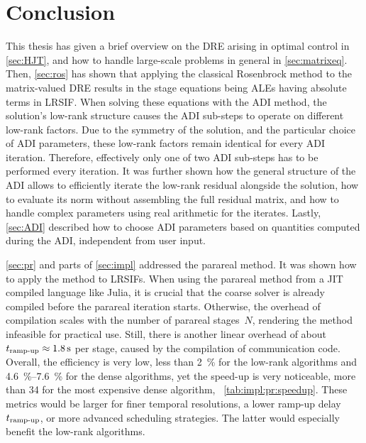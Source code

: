\chapter{Conclusion}
\label{sec:conclusion}


This thesis has given a brief overview on the \ac{DRE} arising in optimal control in \autoref{sec:HJT},
and how to handle large-scale problems in general in \autoref{sec:matrixeq}.
Then, \autoref{sec:ros} has shown that
applying the classical Rosenbrock method to the matrix-valued \ac{DRE}
results in the stage equations being \acp{ALE}
having absolute terms in \ac{LRSIF}.
When solving these equations with the \ac{ADI} method,
the solution's low-rank structure causes the \ac{ADI} sub-steps to operate on different low-rank factors.
Due to the symmetry of the solution,
and the particular choice of \ac{ADI} parameters,
these low-rank factors remain identical for every \ac{ADI} iteration.
Therefore, effectively only one of two \ac{ADI} sub-steps has to be performed every iteration.
It was further shown how the general structure of the \ac{ADI} allows to efficiently iterate the low-rank residual alongside the solution,
how to evaluate its norm without assembling the full residual matrix,
and how to handle complex parameters using real arithmetic for the iterates.
Lastly, \autoref{sec:ADI} described how to choose \ac{ADI} parameters based on quantities computed during the \ac{ADI},
\ie independent from user input.

\autoref{sec:pr} and parts of \autoref{sec:impl} addressed the parareal method.
It was shown how to apply the method to \acp{LRSIF}.
When using the parareal method from a \ac{JIT} compiled language like Julia,
it is crucial that the coarse solver is already compiled before the parareal iteration starts.
Otherwise, the overhead of compilation scales with the number of parareal stages~$N$,
rendering the method infeasible for practical use.
Still, there is another linear overhead of about $t_\text{ramp-up} \approx \SI{1.8}{\second}$ per stage,
caused by the compilation of communication code.
Overall, the efficiency is very low,
less than \SI{2}{\percent} for the low-rank algorithms and
\SIrange{4.6}{7.6}{\percent} for the dense algorithms,
yet the speed-up is very noticeable,
\eg more than \num{34} for the most expensive dense algorithm,
\cf~\autoref{tab:impl:pr:speedup}.
These metrics would be larger for finer temporal resolutions,
a lower ramp-up delay~$t_\text{ramp-up}$,
or more advanced scheduling strategies.
The latter would especially benefit the low-rank algorithms.

